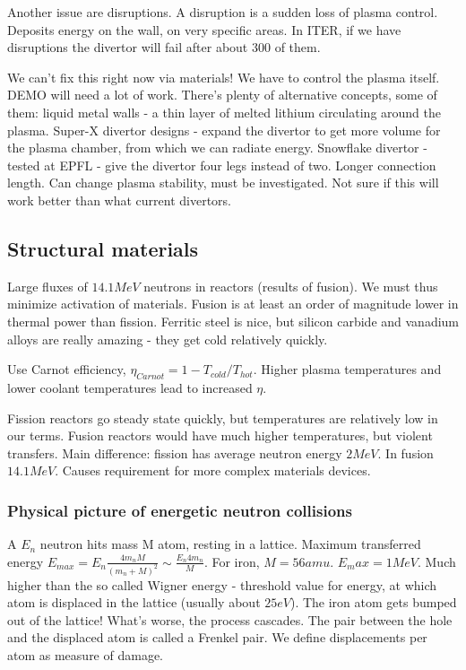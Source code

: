 \documentclass[PlasmaNotes.tex]{subfiles}
\begin{document}
Another issue are disruptions. A disruption is a sudden loss of plasma control. Deposits energy on the wall, on very specific areas. In ITER, if we have disruptions the divertor will fail after about 300 of them.

We can't fix this right now via materials! We have to control the plasma itself. DEMO will need a lot of work. There's plenty of alternative concepts, some of them: liquid metal walls - a thin layer of melted lithium circulating around the plasma. Super-X divertor designs - expand the divertor to get more volume for the plasma chamber, from which we can radiate energy. Snowflake divertor - tested at EPFL - give the divertor four legs instead of two. Longer connection length. Can change plasma stability, must be investigated. Not sure if this will work better than what current divertors.

\subsection{Structural materials}

Large fluxes of $14.1 MeV$ neutrons in reactors (results of fusion). We must thus minimize activation of materials. Fusion is at least an order of magnitude lower in thermal power than fission. Ferritic steel is nice, but silicon carbide and vanadium alloys are really amazing - they get cold relatively quickly.

Use Carnot efficiency, $\eta_{Carnot} = 1 - T_{cold}/T_{hot}$. Higher plasma temperatures and lower coolant temperatures lead to increased $\eta$.

Fission reactors go steady state quickly, but temperatures are relatively low in our terms. Fusion reactors would have much higher temperatures, but violent transfers. Main difference: fission has average neutron energy $2 MeV$. In fusion $14.1 MeV$. Causes requirement for more complex materials devices.

\subsubsection{Physical picture of energetic neutron collisions}

A $E_n$ neutron hits mass M atom, resting in a lattice. Maximum transferred energy $E_{max} = E_n \frac{4 m_n M}{(m_n+M)^2} \sim \frac{E_n 4 m_n}{M}$. For iron, $M=56 amu$. $E_max = 1 MeV$. Much higher than the so called Wigner energy - threshold value for energy, at which atom is displaced in the lattice (usually about $25 eV$). The iron atom gets bumped out of the lattice! What's worse, the process cascades. The pair between the hole and the displaced atom is called a Frenkel pair. We define displacements per atom as measure of damage.
\end{document}
